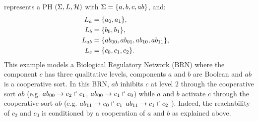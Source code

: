 \begin{example}
 represents a PH $(\Sigma,L,\mathcal{H})$ with $\Sigma = \{a,b,c,ab\}$, and:
\begin{align*}
L_a &= \{a_0,a_1\},\\
L_b &= \{b_0, b_1\},\\
L_{ab} &= \{ab_{00}, ab_{01}, ab_{10}, ab_{11}\},&\\
L_c &= \{c_0, c_1, c_2\}.
\end{align*}
This example models a Biological Regulatory Network (BRN) where the component $c$ has three qualitative levels, components $a$ and $b$ are Boolean and $ab$ is a cooperative sort.
In this BRN, $ab$ inhibits $c$ at level $2$ through the cooperative sort $ab$ (e.g. $ab_{00}\rightarrow c_2\Rsh c_1$, $ab_{00}\rightarrow c_1\Rsh c_0$) while $a$ and $b$ activate $c$  
through the cooperative sort $ab$ (e.g. $ab_{11}\rightarrow c_0\Rsh c_1$ $ab_{11}\rightarrow c_1\Rsh c_2$ ). Indeed, the reachability of $c_2$ and $c_0$ 
is conditioned by a cooperation of $a$ and $b$ as explained above.

\begin{figure}[!h]
\begin{minipage}{0.1\linewidth}
\centering
{}
\end{minipage}
\hspace{2cm}
\begin{minipage}{0.7\linewidth}
\centering
{}
\end{minipage}
\end{figure}
\end{example}

